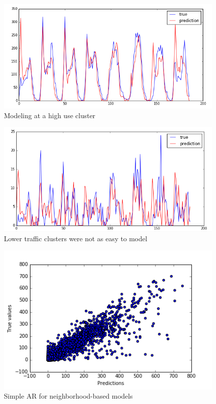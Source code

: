 \documentclass{proc}
\begin{document}
\begin{figure}[!hbt]
	\begin{center}
	\includegraphics[width=\columnwidth]{cluster_24ar.png}
	\caption{Modeling at a high use cluster}
	\end{center}
\end{figure}
\begin{figure}[!hbt]
	\begin{center}
	\includegraphics[width=\columnwidth]{cluster_11ar.png}
	\caption{Lower traffic clusters were not as easy to model}
	\end{center}
\end{figure}

\begin{figure}[!hbt]
	\begin{center}
	\includegraphics[width=\columnwidth]{cluster_ar_scatter.png}
	\caption{Simple AR for neighborhood-based models}
	\end{center}
\end{figure}
\end{document}
